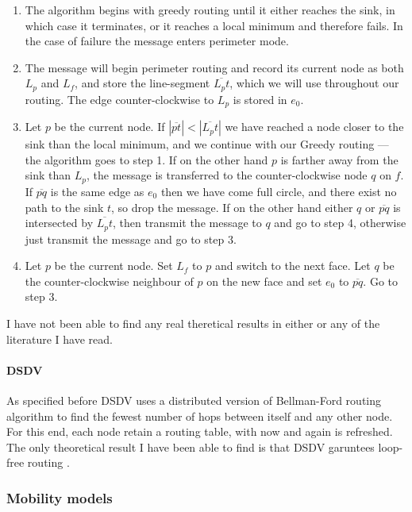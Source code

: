 \begin{enumerate}
\item The algorithm begins with greedy routing until it either reaches the sink, in which case it terminates, or it reaches a local minimum and therefore fails. In the case of failure the message enters perimeter mode.

\item The message will begin perimeter routing and record its current node as both $L_p$ and $L_f$, and store the line-segment $\overline{L_pt}$, which we will use throughout our routing. The edge counter-clockwise to $L_p$ is stored in $e_0$.

\item Let $p$ be the current node. If $|\overline{pt}| < |\overline{L_pt}|$ we have reached a node closer to the sink than the local minimum, and we continue with our Greedy routing --- the algorithm goes to step 1. If on the other hand $p$ is farther away from the sink than $L_p$, the message is transferred to the counter-clockwise node $q$ on $f$. If $\overline{pq}$ is the same edge as $e_0$ then we have come full circle, and there exist no path to the sink $t$, so drop the message. If on the other hand either $q$ or $\overline{pq}$ is intersected by $\overline{L_pt}$, then transmit the message to $q$ and go to step 4, otherwise just transmit the message and go to step 3.

\item Let $p$ be the current node. Set $L_f$ to $p$ and switch to the next face. Let $q$ be the counter-clockwise neighbour of $p$ on the new face and set $e_0$ to $\overline{pq}$. Go to step 3. 
\end{enumerate}

I have not been able to find any real theretical results in either \cite{gpsr} or any of the literature I have read.

\paragraph{DSDV}

As specified before DSDV uses a distributed version of Bellman-Ford routing algorithm to find the fewest number of hops between itself and any other node. For this end, each node retain a routing table, with now and again is refreshed. The only theoretical result I have been able to find is that DSDV garuntees loop-free routing \cite{DSDV}.

\subsubsection{Mobility models}
\label{section:mobility_model}

